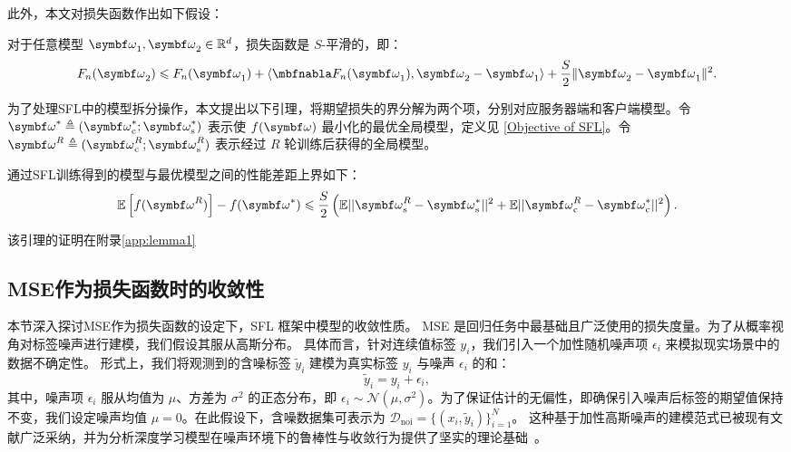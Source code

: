 \noindent 此外，本文对损失函数作出如下假设：%

\begin{assumption}[$S$-平滑性]\label{ass:smooth}
对于任意模型 $\omegab_1, \omegab_2\in \mathbb{R}^d$，损失函数是 $S$-平滑的，即：
$$
F_n(\omegab_2) \leq F_n(\omegab_1)+\langle \nabla F_n(\omegab_1), \omegab_2-\omegab_1\rangle +\frac{S}{2}\|\omegab_2-\omegab_1\|^2.
$$
\end{assumption}
为了处理SFL中的模型拆分操作，本文提出以下引理，将期望损失的界分解为两个项，分别对应服务器端和客户端模型。令 $\omegab^*\triangleq(\omegabc^*; \omegabs^*)$ 表示使 $f(\omegab)$ 最小化的最优全局模型，定义见 \eqref{Objective of SFL}。令 $\omegab^R\triangleq(\omegabc^R; \omegabs^R)$ 表示经过 $R$ 轮训练后获得的全局模型。

\begin{lemma}\label{lemma:decomp}
通过SFL训练得到的模型与最优模型之间的性能差距上界如下：
\begin{equation}
\mathbb{E}\left[f(\omegab^{R})\right]- f(\omegab^*)\le\frac{S}{2}\left(\mathbb{E}||\omegabs^{R}-\omegabs^*||^2+\mathbb{E}||\omegabc^{R}-\omegabc^*||^2\right).
\end{equation}
\end{lemma}
该引理的证明在附录\ref{app:lemma1}
\subsection{MSE作为损失函数时的收敛性}\label{subsec:mse}
本节深入探讨MSE作为损失函数的设定下，SFL 框架中模型的收敛性质。
MSE 是回归任务中最基础且广泛使用的损失度量。为了从概率视角对标签噪声进行建模，我们假设其服从高斯分布。
具体而言，针对连续值标签 $y_i$，我们引入一个加性随机噪声项 $\epsilon_i$ 来模拟现实场景中的数据不确定性。
形式上，我们将观测到的含噪标签 $\tilde{y}_i$ 建模为真实标签 $y_i$ 与噪声 $\epsilon_i$ 的和：
\begin{equation}
    \tilde{y}_i = y_i + \epsilon_i,
\end{equation}
其中，噪声项 $\epsilon_i$ 服从均值为 $\mu$、方差为 $\sigma^2$ 的正态分布，即 $\epsilon_i \sim \mathcal{N}(\mu, \sigma^2)$。为了保证估计的无偏性，即确保引入噪声后标签的期望值保持不变，我们设定噪声均值 $\mu = 0$。在此假设下，含噪数据集可表示为 $\mathcal{D}_{\text{noi}} = \{(x_i, \tilde{y}_i)\}_{i=1}^N$。
这种基于加性高斯噪声的建模范式已被现有文献广泛采纳，并为分析深度学习模型在噪声环境下的鲁棒性与收敛行为提供了坚实的理论基础~\cite{frenay2013classification}。
 
